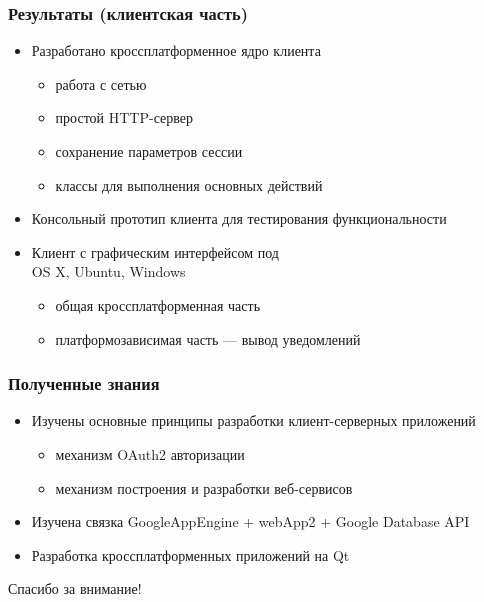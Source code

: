 \documentclass[10pt,pdf,hyperref={unicode}]{beamer}
\begin{document}
    \begin{frame}\frametitle{Результаты (клиентская часть)}
        \begin{itemize}%
            \item Разработано кроссплатформенное ядро клиента            	
            \begin{itemize}
                \item работа с сетью
                \item простой HTTP-сервер
                \item сохранение параметров сессии
                \item классы для выполнения основных действий
            \end{itemize}
            \pause
            \item Консольный прототип клиента для тестирования функциональности
            \pause
            \item Клиент с графическим интерфейсом под \\ OS X, Ubuntu, Windows
            \begin{itemize}
                \item общая кроссплатформенная часть
                \item платформозависимая часть --- вывод уведомлений
            \end{itemize}
        \end{itemize}
    \end{frame}

    \begin{frame}\frametitle{Полученные знания}
        \begin{itemize}%
            \item	Изучены основные принципы разработки клиент-серверных приложений
            \begin{itemize}
                \item механизм OAuth2 авторизации
                \item механизм построения и разработки веб-сервисов
            \end{itemize}            
            \item	Изучена связка GoogleAppEngine + webApp2 + Google Database API
            \item	Разработка кроссплатформенных приложений на Qt
        \end{itemize}
    \end{frame}

    \begin{frame}
        \begin{center}
            Спасибо за внимание!
        \end{center}
    \end{frame}
\end{document}
